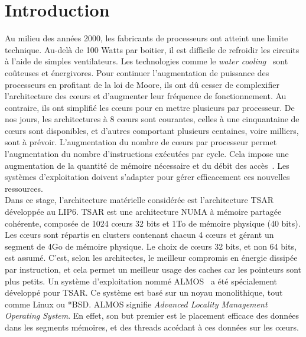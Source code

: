 \chapter{Introduction}

  \hspace{1cm}Au milieu des années 2000, les fabricants de processeurs ont
  atteint une limite technique.  Au-delà de 100 Watts par boitier, il est
  difficile de refroidir les circuits à l'aide de simples ventilateurs. Les
  technologies comme le \textit{water cooling}~\citep{googleXXXXdatacenters}
  sont coûteuses et énergivores.  Pour continuer l'augmentation de puissance des
  processeurs en profitant de la loi de Moore, ils ont dû cesser de complexifier
  l'architecture des c\oe urs et d'augmenter leur fréquence de
  fonctionnement. Au contraire, ils ont simplifié les c\oe urs pour en mettre
  plusieurs par processeur.  De nos jours, les architectures à 8 c\oe urs sont
  courantes, celles à une cinquantaine de c\oe urs sont disponibles, et d'autres
  comportant plusieurs centaines, voire milliers, sont à prévoir.
  L'augmentation du nombre de c\oe urs par processeur permet l'augmentation du
  nombre d'instructions exécutées par cycle.  Cela impose une augmentation de la
  quantité de mémoire nécessaire et du débit des accès~\citep{hp2012z820,
    puget2013z9pe}. Les systèmes d'exploitation doivent s'adapter pour gérer
  efficacement ces nouvelles ressources.\\

  \hspace{1cm}Dans ce stage, l'architecture matérielle considérée est
  l'architecture TSAR~\citep{greiner2009tsar} développée au LIP6. TSAR est une
  architecture NUMA à mémoire partagée cohérente, composée de 1024 c\oe urs 32
  bits et 1To de mémoire physique (40 bits). Les c\oe urs sont répartis en
  clusters contenant chacun 4 c\oe urs et gérant un segment de 4Go de mémoire
  physique. Le choix de c\oe urs 32 bits, et non 64 bits, est assumé. C'est,
  selon les architectes, le meilleur compromis en énergie dissipée par
  instruction, et cela permet un meilleur usage des caches car les pointeurs
  sont plus petits.  Un système d'exploitation nommé
  ALMOS~\citep{almaless2011almos} a été spécialement développé pour TSAR. Ce
  système est basé sur un noyau monolithique, tout comme Linux ou *BSD. ALMOS
  signifie \textit{Advanced Locality Management Operating System}. En effet, son
  but premier est le placement efficace des données dans les segments mémoires,
  et des threads accédant à ces données sur les c\oe urs.\\

